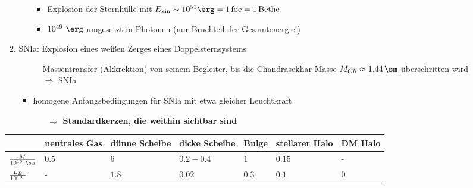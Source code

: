 \begin{itemize}
\begin{enumerate}[label={$(\roman*)$}]
\begin{itemize}[label={$\to$}]
						\begin{itemize}[label={$\Rightarrow$}]
							\item Explosion der Sternhülle mit $E_\text{kin}\sim 10^{51}\si{\erg}=\SI{1}{\text{foe}}=\SI{1}{\text{Bethe}}$
							\item $10^{49}~\si{\erg}$ umgesetzt in Photonen (nur Bruchteil der Gesamtenergie!)
						\end{itemize}
				\end{itemize}
			\item SNIa: Explosion eines weißen Zerges eines Doppelsternsystems
				\begin{figure}[H]
					\begin{multicols}{2}
						\begin{figure}[H]
						\end{figure}\columnbreak
						Massentransfer (Akkrektion) von seinem Begleiter, bis die Chandrasekhar-Masse $M_{Ch}\approx\SI{1.44}{\sm}$ überschritten wird $\Rightarrow$ SNIa
					\end{multicols}
				\end{figure}
				\begin{itemize}[label={$\to$}]
					\item homogene Anfangsbedingungen für SNIa mit etwa gleicher Leuchtkraft
						\begin{itemize}
							\item[$\Rightarrow$] \textbf{Standardkerzen, die weithin sichtbar sind}
						\end{itemize}
				\end{itemize}
		\end{enumerate}
		\begin{table}[H]
			\def\k{1.5}
			\begin{tabular}{p{2 cm}|p{\k cm}|p{\k cm}|p{\k cm}|p{\k cm}|p{\k cm}|p{\k cm}}
				& neutrales Gas & dünne Scheibe & dicke Scheibe & Bulge & stellarer Halo & DM Halo \\\hline
				$\frac{M}{10^{10}~\si{\sm}}$ & $\num{0.5}$ & $\num{6}$ & $\num{0.2}-\num{0.4}$ & $\num{1}$ & $\num{0.15}$ & - \\\hline
				$\frac{L_B}{10^{10}~\si{\sl}}$ & - & $\num{1.8}$ & $\num{0.02}$ & $\num{0.3}$ & $\num{0.1}$ & $\num{0}$ \\\hline

\end{tabular}
\end{table}
\end{itemize}
